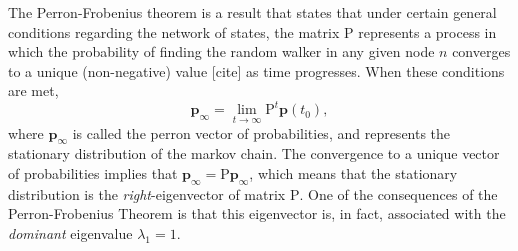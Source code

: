 \documentclass[letterpaper, 14pt]{extarticle}
\renewcommand{\vec}[1]{\bm{#1}}
\newcommand{\mat}[1]{\bm{\mathrm{#1}}}
\begin{document}
The Perron-Frobenius theorem is a result that states that under certain general conditions regarding the network of states, the matrix $\mat{P}$ represents a process in which the probability of finding the random walker in any given node $n$ converges to a unique (non-negative) value [cite] as time progresses. When these conditions are met,
$$
\vec{p}_\infty=\lim_{t\rightarrow\infty}\mathrm{P}^t\vec{p}(t_0),
$$
where $\vec{p}_\infty$ is called the perron vector of probabilities, and represents the stationary distribution of the markov chain. The convergence to a unique vector of probabilities implies that $\vec{p}_\infty = \mat{P}\vec{p}_\infty$, which means that the stationary distribution is the \emph{right}-eigenvector of matrix $\mat{P}$. One of the consequences of the Perron-Frobenius Theorem is that this eigenvector is, in fact, associated with the \emph{dominant} eigenvalue $\lambda_1=1$.






%
%





\end{document}
